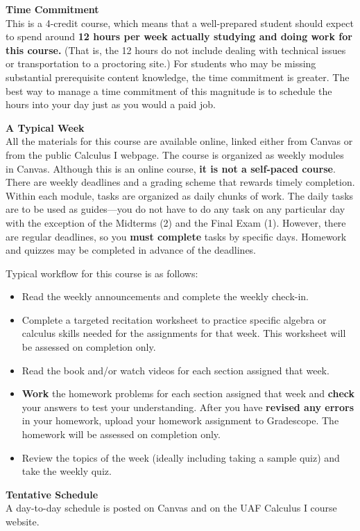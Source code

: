 \documentclass[12pt]{article}
\renewcommand{\emph}[1]{\textsf{\textbf{#1}}}
\newcommand{\localhead}[1]{\par\smallskip\textbf{#1}\nobreak\\}%
\def\heading#1{\localhead{\large\emph{#1}}}
\begin{document}
\heading{Time Commitment}
This is a 4-credit course, which means that a well-prepared student should expect to spend around {\bf 12
hours per week actually studying and doing work for this course.} (That is, the 12 hours do not include dealing with
technical issues or transportation to a proctoring site.) For students who may be missing substantial
prerequisite content knowledge, the time commitment is greater. The best way to manage a time
commitment of this magnitude is to schedule the hours into your day just as you would a paid job.

\heading{A Typical Week}
All the materials for this course are available online, linked either from Canvas or from the public Calculus I webpage. The course is organized as weekly modules in Canvas. Although this is
an online course, \emph{it is not a self-paced course}. There are weekly
deadlines and a grading scheme that rewards timely completion. Within each module, tasks are
organized as daily chunks of work. The daily tasks are to be used as guides---you do not have
to do any task on any particular day with the exception of the Midterms (2) and the
Final Exam (1). However, there are regular deadlines, so you \emph{must complete} tasks by specific days. Homework and quizzes may be completed in advance of the deadlines. 

Typical workflow for this course is as follows: 
\begin{itemize}
\item Read the weekly announcements and complete the weekly check-in.
\item Complete a targeted recitation worksheet to practice specific algebra or calculus skills needed for the assignments for that week. This worksheet will be assessed on completion only.
\item Read the book and/or watch videos for each section assigned that week.
\item \emph{Work} the homework problems for each section assigned that week and \emph{check} your answers to test your understanding. After you have \emph{revised any errors} in your homework, upload your homework assignment to Gradescope. The homework will be assessed on completion only.
\item Review the topics of the week (ideally including taking a sample quiz) and take the weekly quiz.
\end{itemize}

\heading{Tentative Schedule}
A day-to-day schedule is posted on Canvas and on the UAF Calculus I course website. 
\end{document}
